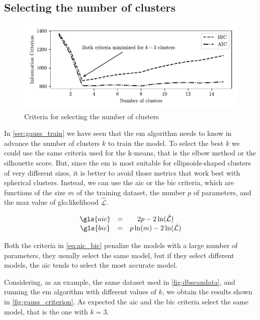 \subsection{Selecting the number of clusters}
\begin{figure}[htbp]
    \centering
    \includegraphics{images/Gaussian/Figure_1.pdf}
    \caption{Criteria for selecting the number of clusters}
    \label{fig:gauss_criterion}
\end{figure}
In \autoref{sec:gauss_train} we have seen that the \gls{em} algorithm needs to know in advance the number of clusters $k$ to train the model. To select the best $k$ we could use the same criteria used for the k-means, that is the elbow method or the silhouette score. But, since the \gls{em} is most suitable for ellipsoids-shaped clusters of very different sizes, it is better to avoid those metrics that work best with spherical clusters. Instead, we can use the \gls{aic} or the \gls{bic} criteria, which are functions of the size $m$ of the training dataset, the number $p$ of parameters, and the max value of \gls{glo:likelihood} $\hat{\mathcal{L}}$.

\begin{equation}
    \begin{matrix}
        \gls{aic} &=& 2p - 2 \ln(\hat{\mathcal{L}}) \\
        \gls{bic} &=& p \ln(m) - 2 \ln(\hat{\mathcal{L}})
    \end{matrix}
    \label{eq:aic_bic}
\end{equation}

Both the criteria in \autoref{eq:aic_bic} penalize the models with a large number of parameters, they usually select the same model, but if they select different models, the \gls{aic} tends to select the most accurate model.

Considering, as an example, the same dataset used in \autoref{fig:dbscandata}, and running the \gls{em} algorithm with different values of $k$, we obtain the results shown in \autoref{fig:gauss_criterion}. As expected the \gls{aic} and the \gls{bic} criteria select the same model, that is the one with $k=3$.

